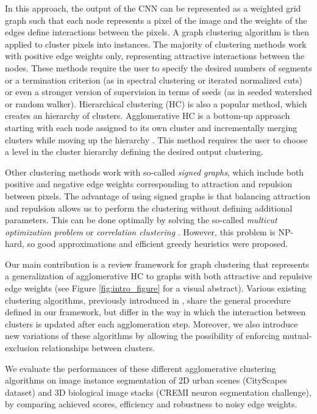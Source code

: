 In this approach, the output of the CNN can be represented as a weighted grid graph such that each node represents a pixel of the image and the weights of the edges define interactions between the pixels. A graph clustering algorithm is then applied to cluster pixels into instances. The majority of clustering methods work with positive edge weights only, representing attractive interactions between the nodes. These methods require the user to specify the desired numbers of segments or a termination criterion (as in spectral clustering or iterated normalized cuts) or even a stronger version of supervision in terms of seeds (as in seeded watershed or random walker).  
Hierarchical clustering (HC) is also a popular method, which creates an hierarchy of clusters. Agglomerative HC is a bottom-up approach starting with each node assigned to its own cluster and incrementally merging clusters while moving up the hierarchy \cite{lance1967general}. This method requires the user to choose a level in the cluster hierarchy defining the desired output clustering. 

Other clustering methods work with so-called \emph{signed graphs}, which include both positive and negative edge weights corresponding to attraction and repulsion between pixels. The advantage of using signed graphs is that balancing attraction and repulsion allows us to perform the clustering without defining additional parameters. This can be done optimally by solving the so-called \emph{multicut optimization problem} or \emph{correlation clustering} \cite{kappes2011globally,chopra1991multiway}. However, this problem is NP-hard, so good approximations \cite{yarkony2012fast,pape2017solving} and efficient greedy heuristics \cite{levinkov2017comparative,wolf2018mutex} were proposed.

Our main contribution is a review framework for graph clustering that represents a generalization of agglomerative HC to graphs with both attractive and repulsive edge weights (see Figure \ref{fig:intro_figure} for a visual abstract). 
Various existing clustering algorithms, previously introduced in \cite{levinkov2017comparative,wolf2018mutex,kardoostsolving,lance1967general}, share the general procedure defined in our framework, but differ in the way in which the interaction between clusters is updated after each agglomeration step. Moreover, we also introduce new variations of these algorithms by allowing the possibility of enforcing mutual-exclusion relationships between clusters.  

We evaluate the performances of these different agglomerative clustering algorithms on image instance segmentation of 2D urban scenes (CityScapes dataset) and 3D biological image stacks (CREMI neuron segmentation challenge), by comparing achieved scores, efficiency and robustness to noisy edge weights.  




